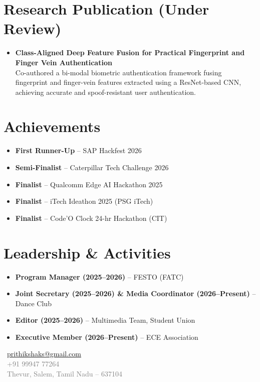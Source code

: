 \documentclass[a4paper,10pt]{article}
\begin{document}
\section{Research Publication (Under Review)}
\begin{itemize}
\item \textbf{Class-Aligned Deep Feature Fusion for Practical Fingerprint and Finger Vein Authentication} \\
Co-authored a bi-modal biometric authentication framework fusing fingerprint and finger-vein features
extracted using a ResNet-based CNN, achieving accurate and spoof-resistant user authentication.
\end{itemize}

\section{Achievements}
\begin{itemize}
\item \textbf{First Runner-Up} -- SAP Hackfest 2026
\item \textbf{Semi-Finalist} -- Caterpillar Tech Challenge 2026
\item \textbf{Finalist} -- Qualcomm Edge AI Hackathon 2025
\item \textbf{Finalist} -- iTech Ideathon 2025 (PSG iTech)
\item \textbf{Finalist} -- Code'O Clock 24-hr Hackathon (CIT)
\end{itemize}

\section{Leadership \& Activities}
\begin{itemize}
\item \textbf{Program Manager (2025--2026)} -- FESTO (FATC)
\item \textbf{Joint Secretary (2025--2026) \& Media Coordinator (2026--Present)} -- Dance Club
\item \textbf{Editor (2025--2026)} -- Multimedia Team, Student Union
\item \textbf{Executive Member (2026--Present)} -- ECE Association
\end{itemize}

\vfill
\begin{flushright}
{\small \textcolor{gray}{
\faEnvelope\ \href{mailto:prithikshaks@gmail.com}{prithikshaks@gmail.com} \\
\faMobile\ +91 99947 77264 \\
\faMapMarker*\ Thevur, Salem, Tamil Nadu -- 637104
}}
\end{flushright}
\end{document}

